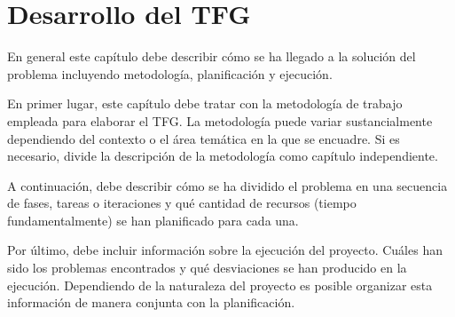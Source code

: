\chapter{Desarrollo del TFG}
\label{ch:desarrollo}

\avisoLocalizacionArchivo 

En general este capítulo debe describir cómo se ha llegado a la solución del problema incluyendo metodología, planificación y ejecución.

En primer lugar, este capítulo debe tratar con la metodología de trabajo empleada para elaborar el TFG.  La metodología puede variar sustancialmente dependiendo del contexto o el área temática en la que se encuadre.  Si es necesario, divide la descripción de la metodología como capítulo independiente.

A continuación, debe describir cómo se ha dividido el problema en una secuencia de fases, tareas o iteraciones y qué cantidad de recursos (tiempo fundamentalmente) se han planificado para cada una.

Por último, debe incluir información sobre la ejecución del proyecto. Cuáles han sido los problemas encontrados y qué desviaciones se han producido en la ejecución.  Dependiendo de la naturaleza del proyecto es posible organizar esta información de manera conjunta con la planificación.
